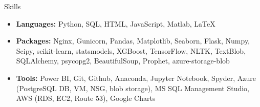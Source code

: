 \documentclass{resume} %
\begin{document}
	\begin{rSection}{Skills}
		\begin{itemize}[leftmargin=0em]
			\item {\bf Languages:}{ Python, SQL, HTML, JavaScript, Matlab, LaTeX}
			\item {\bf Packages:}{ Nginx, Gunicorn, Pandas, Matplotlib, Seaborn, Flask, Numpy, Scipy, scikit-learn, statsmodels, XGBoost, TensorFlow, NLTK, TextBlob, SQLAlchemy, psycopg2, BeautifulSoup, Prophet, azure-storage-blob}
			\item {\bf Tools:}{ Power BI, Git, Github, Anaconda, Jupyter Notebook, Spyder, Azure (PostgreSQL DB, VM, NSG, blob storage), MS SQL Management Studio, AWS (RDS, EC2, Route 53), Google Charts }
			
		\end{itemize}
	\end{rSection}
	
\end{document}
